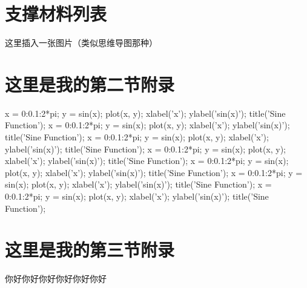 \documentclass[UTF8]{report}
\theoremstyle{MyLineTheoremStyle} %
\theoremstyle{MyBlockTheoremStyle} %
\theoremstyle{MySubsubsectionStyle} %
\begin{document}
\setcounter{section}{0}
\renewcommand\thesection{A.\arabic{section}}

\section{支撑材料列表} 

\begin{center}
  这里插入一张图片（类似思维导图那种）
\end{center}
\section{这里是我的第二节附录}

\begin{matlablisting}
x = 0:0.1:2*pi;
y = sin(x);
plot(x, y);
xlabel('x');
ylabel('sin(x)');
title('Sine Function');
x = 0:0.1:2*pi;
y = sin(x);
plot(x, y);
xlabel('x');
ylabel('sin(x)');
title('Sine Function');
x = 0:0.1:2*pi;
y = sin(x);
plot(x, y);
xlabel('x');
ylabel('sin(x)');
title('Sine Function');
x = 0:0.1:2*pi;
y = sin(x);
plot(x, y);
xlabel('x');
ylabel('sin(x)');
title('Sine Function');
x = 0:0.1:2*pi;
y = sin(x);
plot(x, y);
xlabel('x');
ylabel('sin(x)');
title('Sine Function');
x = 0:0.1:2*pi;
y = sin(x);
plot(x, y);
xlabel('x');
ylabel('sin(x)');
title('Sine Function');
x = 0:0.1:2*pi;
y = sin(x);
plot(x, y);
xlabel('x');
ylabel('sin(x)');
title('Sine Function');
\end{matlablisting}

\section{这里是我的第三节附录}
你好你好你好你好你好你好
\end{document}
